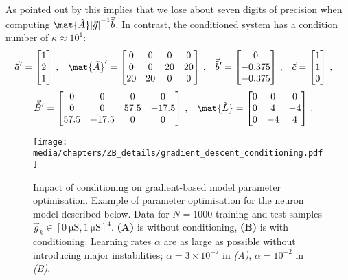 As pointed out by \citet[Section~8.4, p.~406]{cheney2012numerical} this implies that we lose about seven digits of precision when computing $\mat{\tilde A}[\vec g]^{-1} \vec{\tilde b}$.
In contrast, the conditioned system has a condition number of $\kappa \approx 10^1$:
\begin{align*}
	\vec{\tilde a}' &= \begin{bmatrix}
		1 \\
		2 \\
		1
	\end{bmatrix} \,,
	&
	\mat{\tilde A}' &= \begin{bmatrix}
		0 & 0 & 0 & 0 \\
		0 & 0 & 20 & 20 \\
		20 & 20 & 0 & 0
	\end{bmatrix} \,,
	&
	\vec{\tilde b}' &= \begin{bmatrix}
		0 \\
		-0.375 \\
		-0.375
	\end{bmatrix} \,,
	&
	\vec{\tilde c} &=
	\begin{bmatrix}
		1 \\
		1 \\
		0
	\end{bmatrix} \,,
\end{align*}\vspace*{-0.125em}
\begin{align*}
	\vec{\tilde B}' &=
	\begin{bmatrix}
		0 & 0 & 0 & 0 \\
		0 & 0 & 57.5 & -17.5 \\
		57.5 & -17.5 & 0 & 0 \\
	\end{bmatrix} \,,
	&
	\mat{\tilde L} &=
	\begin{bmatrix}
		0 & 0 & 0 \\
		0 & 4 & -4 \\
		0 & -4 & 4 \\
	\end{bmatrix} \,.
\end{align*}


\begin{figure}
	\texttt{[image: media/chapters/ZB\_details/gradient\_descent\_conditioning.pdf]}
	\caption[Impact of conditioning on gradient-based model parameter optimisation]{Impact of conditioning on gradient-based model parameter optimisation.
	Example of parameter optimisation for the neuron model described below.
	Data for $N = 1000$ training and test samples $\vec g_k \in [\SI{0}{\micro\siemens}, \SI{1}{\micro\siemens}]^4$.
	\textbf{(A)} is without conditioning, \textbf{(B)} is with conditioning.
	Learning rates $\alpha$ are as large as possible without introducing major instabilities; $\alpha = 3 \times 10^{-7}$ in \emph{(A)}, $\alpha = 10^{-2}$ in \emph{(B)}.}
	\label{fig:gradient_descent_conditioning}
\end{figure}

